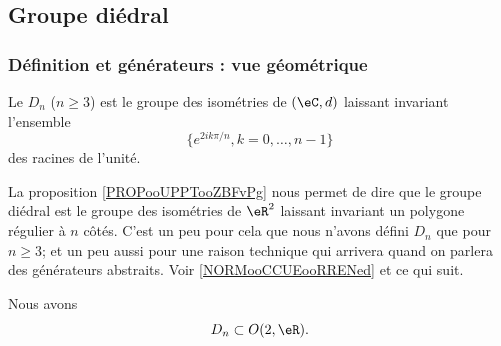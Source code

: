 \subsection{Groupe diédral}


\subsubsection{Définition et générateurs : vue géométrique}

\begin{definition}  \label{DEFooIWZGooAinSOh}
	Le  \( D_n\) (\( n\geq 3\)) est le groupe des isométries de \( (\eC,d)\) laissant invariant l'ensemble
	\begin{equation}
		\{  e^{2ik\pi/n},k=0,\ldots, n-1 \}
	\end{equation}
	des racines de l'unité.
\end{definition}

\begin{normaltext}
	La proposition \ref{PROPooUPPTooZBFvPg} nous permet de dire que le groupe diédral est le groupe des isométries de \( \eR^2\) laissant invariant un polygone régulier à \( n\) côtés.
	C'est un peu pour cela que nous n'avons défini \( D_n\) que pour \( n\geq 3\); et un peu aussi pour une raison technique qui arrivera quand on parlera des générateurs abstraits. Voir \ref{NORMooCCUEooRRENed} et ce qui suit.
\end{normaltext}

\begin{lemma}       \label{LEMooCUVPooMZKnzo}
	Nous avons
	\begin{equation}
		D_n\subset O(2,\eR).
	\end{equation}
\end{lemma}

